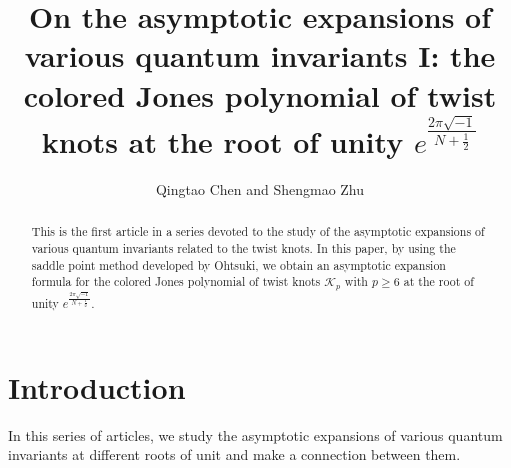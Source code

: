 \documentclass[12pt]{amsart}
\begin{document}
\title[On the asymptotic expansions I]{On the asymptotic expansions of various quantum invariants I: the colored Jones polynomial of twist knots at the root of unity $e^{\frac{2\pi\sqrt{-1}}{N+\frac{1}{2}}}$}


\author[Qingtao Chen and Shengmao Zhu]{Qingtao Chen and
Shengmao Zhu}

\address{Department of Pure Mathematics \\
Xi'an Jiaotong-Liverpool University \\
Suzhou Jiangsu \\
China}



\address{Department of Mathematics \\
Zhejiang Normal University,  \\
Jinhua Zhejiang,  321004, China }

\begin{abstract}
This is the first article in a series devoted to the study of the asymptotic expansions of various quantum invariants related to the twist knots. In this paper,  by using the saddle point method developed by Ohtsuki, we obtain an asymptotic expansion formula for the colored Jones polynomial of twist knots $\mathcal{K}_p$ with $p\geq 6$ at the root of unity $e^{\frac{2\pi\sqrt{-1}}{N+\frac{1}{2}}}$. 
\end{abstract}
\maketitle


\theoremstyle{plain} \newtheorem{thm}{Theorem}[section] \newtheorem{theorem}[%
thm]{Theorem} \newtheorem{lemma}[thm]{Lemma} \newtheorem{corollary}[thm]{%
Corollary} \newtheorem{proposition}[thm]{Proposition} \newtheorem{conjecture}%
[thm]{Conjecture} \theoremstyle{definition}
\newtheorem{remark}[thm]{Remark}
\newtheorem{remarks}[thm]{Remarks} \newtheorem{definition}[thm]{Definition}
\newtheorem{example}[thm]{Example}
\tableofcontents
\newpage

\section{Introduction}
In this series of articles, we study the asymptotic expansions of various quantum invariants at different roots of unit and make a connection between them. 
\end{document}

